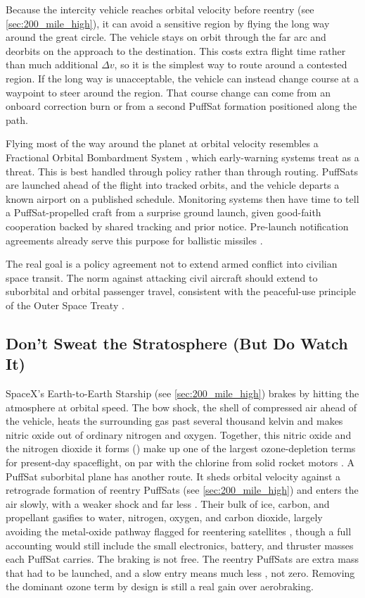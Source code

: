 \documentclass{article}
\newcommand{\deltav}{\Delta v}
\begin{document}
Because the intercity vehicle reaches orbital velocity before reentry (see \autoref{sec:200_mile_high}), it can avoid a sensitive region by flying the long way around the great circle. The vehicle stays on orbit through the far arc and deorbits on the approach to the destination. This costs extra flight time rather than much additional $\deltav$, so it is the simplest way to route around a contested region. If the long way is unacceptable, the vehicle can instead change course at a waypoint to steer around the region. That course change can come from an onboard correction burn or from a second PuffSat formation positioned along the path.

Flying most of the way around the planet at orbital velocity resembles a Fractional Orbital Bombardment System \cite{salt2_fobs}, which early-warning systems treat as a threat. This is best handled through policy rather than through routing. PuffSats are launched ahead of the flight into tracked orbits, and the vehicle departs a known airport on a published schedule. Monitoring systems then have time to tell a PuffSat-propelled craft from a surprise ground launch, given good-faith cooperation backed by shared tracking and prior notice. Pre-launch notification agreements already serve this purpose for ballistic missiles \cite{us_ussr_launch_notification}.

The real goal is a policy agreement not to extend armed conflict into civilian space transit. The norm against attacking civil aircraft \cite{chicago_3bis} should extend to suborbital and orbital passenger travel, consistent with the peaceful-use principle of the Outer Space Treaty \cite{outer_space_treaty}.

\subsection{Don't Sweat the Stratosphere (But Do Watch It)}\label{sec:ozone_policy}\cite{carlson1997smallstuff}
SpaceX's Earth-to-Earth Starship (see \autoref{sec:200_mile_high}) brakes by hitting the atmosphere at orbital speed. The bow shock, the shell of compressed air ahead of the vehicle, heats the surrounding gas past several thousand kelvin and makes nitric oxide out of ordinary nitrogen and oxygen. Together, this nitric oxide and the nitrogen dioxide it forms () make up one of the largest ozone-depletion terms for present-day spaceflight, on par with the chlorine from solid rocket motors \cite{ryan2022rocket}. A PuffSat suborbital plane has another route. It sheds orbital velocity against a retrograde formation of reentry PuffSats (see \autoref{sec:200_mile_high}) and enters the air slowly, with a weaker shock and far less . Their bulk of ice, carbon, and propellant gasifies to water, nitrogen, oxygen, and carbon dioxide, largely avoiding the metal-oxide pathway flagged for reentering satellites \cite{ferreira2024ozone, barker2026megaconstellation}, though a full accounting would still include the small electronics, battery, and thruster masses each PuffSat carries. The braking is not free. The reentry PuffSats are extra mass that had to be launched, and a slow entry means much less , not zero. Removing the dominant ozone term by design is still a real gain over aerobraking.
\end{document}
